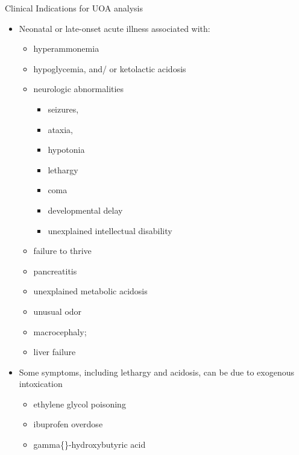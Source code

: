 \documentclass[presentation, smaller]{beamer}
\begin{document}
\begin{frame}[label={sec:orgheadline10}]{Clinical Indications for UOA analysis}
\begin{itemize}
\item Neonatal or late-onset acute illness associated with:
\begin{itemize}
\item hyperammonemia
\item hypoglycemia, and/ or ketolactic acidosis
\item neurologic abnormalities
\begin{itemize}
\item seizures,
\item ataxia,
\item hypotonia
\item lethargy
\item coma
\item developmental delay
\item unexplained intellectual disability
\end{itemize}
\item failure to thrive
\item pancreatitis
\item unexplained metabolic acidosis
\item unusual odor
\item macrocephaly;
\item liver failure
\end{itemize}
\item Some symptoms, including lethargy and acidosis, can be due to exogenous intoxication
\begin{itemize}
\item ethylene glycol poisoning
\item ibuprofen overdose
\item gamma\{\}-hydroxybutyric acid
\end{itemize}
\end{itemize}
\end{frame}
\end{document}
